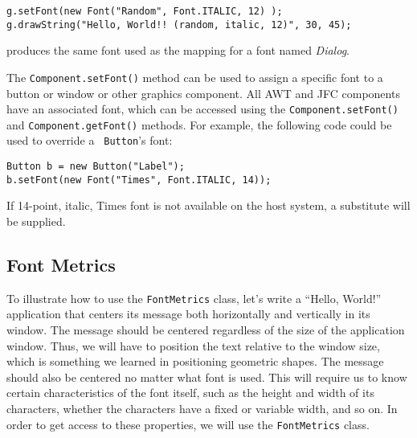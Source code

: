 \begin{jjjlisting}
\begin{lstlisting}
g.setFont(new Font("Random", Font.ITALIC, 12) );
g.drawString("Hello, World!! (random, italic, 12)", 30, 45);
\end{lstlisting}
\end{jjjlisting}

\noindent produces the same font used as the mapping for a
font named {\em Dialog}.


The {\tt Component.setFont()} method can be used to assign a specific
font to a button or window or other graphics component.  All AWT and
JFC components have an associated font, which can be accessed using
the {\tt Component.setFont()} and {\tt Component.getFont()} methods.
For example, the following code could be used to override a {\tt
Button}'s font:

\begin{jjjlisting}
\begin{lstlisting}
Button b = new Button("Label");
b.setFont(new Font("Times", Font.ITALIC, 14));
\end{lstlisting}
\end{jjjlisting}

\noindent If 14-point, italic, Times font is not available on the
host system, a substitute will be supplied.

\subsection{Font Metrics}
\noindent To illustrate how to use the {\tt FontMetrics} class, let's write a
``Hello, World!'' application that centers its message both horizontally and
vertically in its window.  The message should be centered
regardless of the size of the application window.  Thus, we will have to
position the text relative to the window size, which is something we
learned in positioning geometric shapes.   The message
should also be centered no matter what font is used.  This will require
us to know certain characteristics of the font itself, such as the
height and width of its characters, whether the characters have a
fixed or variable width, and so on.  In order to get access to
these properties, we will use the {\tt FontMetrics} class.

